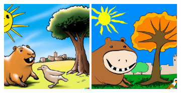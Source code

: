 \documentclass{article}
\newcommand{\imagewidthfactor}{0.4}
\begin{document}
\begin{figure}[h!]
\vspace{1.1em}
\includegraphics[width=\imagewidthfactor\textwidth]{media/1c.png}
\quad
\includegraphics[width=\imagewidthfactor\textwidth]{media/1d.png}
\end{figure}
\end{document}
